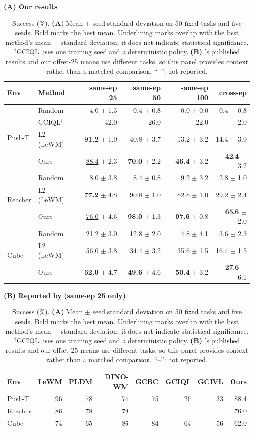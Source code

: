 \documentclass{article}
\theoremstyle{definition}
\theoremstyle{remark}
\begin{document}
\begin{table}[t]
\centering\small
\caption{Success (\%). \textbf{(A)} Mean $\pm$ seed standard deviation on 50 fixed tasks and five seeds. Bold marks the best mean. Underlining marks overlap with the best method's mean $\pm$ standard deviation; it does not indicate statistical significance. $^\dagger$GCIQL uses one training seed and a deterministic policy. \textbf{(B)} \citet{lewm}'s published results and our offset-25 means use different tasks, so this panel provides context rather than a matched comparison. ``--'': not reported.}
\label{tab:main}
\textbf{(A) Our results}\par\smallskip
\begin{tabular}{llrrrr}
\toprule
Env & Method & same-ep 25 & same-ep 50 & same-ep 100 & cross-ep \\
\midrule
\multirow{4}{*}{Push-T} & Random & 4.0 $\pm$ 1.3 & 0.4 $\pm$ 0.8 & 0.0 $\pm$ 0.0 & 0.4 $\pm$ 0.8 \\
 & GCIQL$^{\dagger}$ & 42.0 & 26.0 & 22.0 & 2.0 \\
 & L2 (LeWM) & \textbf{91.2} $\pm$ 1.0 & 40.8 $\pm$ 3.7 & 13.2 $\pm$ 3.2 & 14.4 $\pm$ 3.9 \\
 & Ours & \underline{88.4} $\pm$ 2.3 & \textbf{70.0} $\pm$ 2.2 & \textbf{46.4} $\pm$ 3.2 & \textbf{42.4} $\pm$ 3.2 \\
\midrule
\multirow{3}{*}{Reacher} & Random & 8.0 $\pm$ 3.8 & 8.4 $\pm$ 0.8 & 9.2 $\pm$ 3.2 & 2.8 $\pm$ 1.0 \\
 & L2 (LeWM) & \textbf{77.2} $\pm$ 4.8 & 90.8 $\pm$ 1.0 & 82.8 $\pm$ 1.0 & 29.2 $\pm$ 2.4 \\
 & Ours & \underline{76.0} $\pm$ 4.6 & \textbf{98.0} $\pm$ 1.3 & \textbf{97.6} $\pm$ 0.8 & \textbf{65.6} $\pm$ 2.0 \\
\midrule
\multirow{3}{*}{Cube} & Random & 21.2 $\pm$ 3.0 & 12.8 $\pm$ 2.0 & 4.8 $\pm$ 4.1 & 3.6 $\pm$ 2.3 \\
 & L2 (LeWM) & \underline{56.0} $\pm$ 3.8 & 34.4 $\pm$ 3.2 & 35.6 $\pm$ 1.5 & 16.4 $\pm$ 1.5 \\
 & Ours & \textbf{62.0} $\pm$ 4.7 & \textbf{49.6} $\pm$ 4.6 & \textbf{50.4} $\pm$ 3.2 & \textbf{27.6} $\pm$ 6.1 \\
\bottomrule
\end{tabular}

\bigskip
\textbf{(B) Reported by \citet{lewm} (same-ep 25 only)}\par\smallskip
\begin{tabular}{lrrrrrr|r}
\toprule
Env & LeWM & PLDM & DINO-WM & GCBC & GCIQL & GCIVL & Ours \\
\midrule
Push-T & 96 & 78 & 74 & 75 & 20 & 33 & 88.4 \\
Reacher & 86 & 78 & 79 & -- & -- & -- & 76.0 \\
Cube & 74 & 65 & 86 & 84 & 64 & 56 & 62.0 \\
\bottomrule
\end{tabular}
\end{table}
\end{document}
